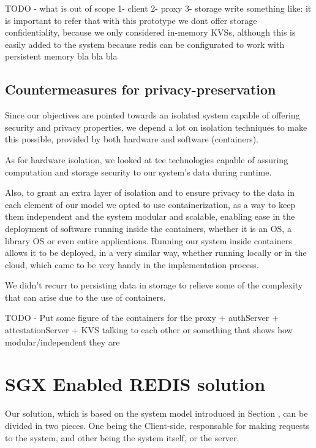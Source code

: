 TODO - what is out of scope
1- client
2- proxy
3- storage
write something like: it is important to refer that with this prototype we dont offer storage confidentiality, because we only considered in-memory KVSs, although this is easily added to the system because redis can be configurated to work with persistent memory bla bla bla

\subsection{Countermeasures for privacy-preservation}

Since our objectives are pointed towards an isolated system capable of offering security
and privacy properties, we depend a lot on isolation techniques to make this possible,
provided by both hardware and software (containers).

As for hardware isolation, we looked at \gls{tee} technologies capable of assuring computation and storage security to our system's data during runtime.

Also, to grant an extra layer of isolation and to ensure privacy to the data in each element of our model we opted to use containerization, as a way to keep them independent and the system modular and scalable, enabling ease in the deployment of software running inside the containers, whether it is an OS, a library
OS or even entire applications. Running our system inside containers allows it to be deployed, in a very similar way, whether running locally or in the cloud, which came to be very handy in the implementation process. 

We didn't recurr to persisting data in storage to relieve some of the complexity that can arise due to the use of containers.



TODO - Put some figure of the containers for the proxy + authServer + attestationServer + KVS talking to each other or something that shows how modular/independent they are





\section{SGX Enabled REDIS solution} %
\label{sec:sgx_redis_solution}

Our solution, which is based on the system model introduced in Section \cite{sec:systemModel_overview}, can be divided in two pieces. One being the Client-side, responsable for making requests to the system, and other being the system itself, or the server. 

